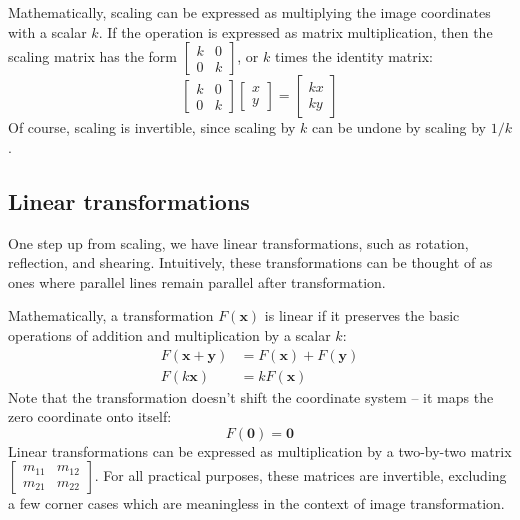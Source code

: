 \documentclass[english,12pt]{ifimaster}
\begin{document}
Mathematically, scaling can be expressed as multiplying the image
coordinates with a scalar $k$. If the operation is expressed as matrix
multiplication, then the scaling matrix has the form
$[\begin{smallmatrix}
  k & 0\\
  0 & k
\end{smallmatrix}]$, or $k$ times the identity matrix:
\begin{equation}
  \left[\begin{matrix}
      k & 0\\
      0 & k
    \end{matrix}\right]
  \left[\begin{matrix}
      x\\
      y
    \end{matrix}\right]
  =
  \left[\begin{matrix}
      kx\\
      ky
    \end{matrix}\right]
\end{equation}
Of course, scaling is invertible, since scaling by $k$ can be undone
by scaling by $1/k$.

\subsection{Linear transformations}

One step up from scaling, we have linear transformations, such as
rotation, reflection, and shearing. Intuitively, these transformations
can be thought of as ones where parallel lines remain parallel after
transformation.

Mathematically, a transformation $F(\mathbf{x})$ is linear if it preserves the
basic operations of addition and multiplication by a scalar $k$:
\begin{align}
  F(\mathbf{x} + \mathbf{y}) &= F(\mathbf{x}) + F(\mathbf{y})\\
  F(k\mathbf{x}) &= kF(\mathbf{x})
\end{align}
Note that the transformation doesn't shift the coordinate system -- it
maps the zero coordinate onto itself:
\begin{equation}
  \label{eq:zero}
  F(\mathbf{0}) = \mathbf{0}
\end{equation}
Linear transformations can be expressed as multiplication by a
two-by-two matrix $[\begin{smallmatrix}
  m_{11} & m_{12}\\
  m_{21} & m_{22}
\end{smallmatrix}]$.
For all practical purposes, these matrices are invertible, excluding a
few corner cases which are meaningless in the context of image
transformation.
\end{document}
